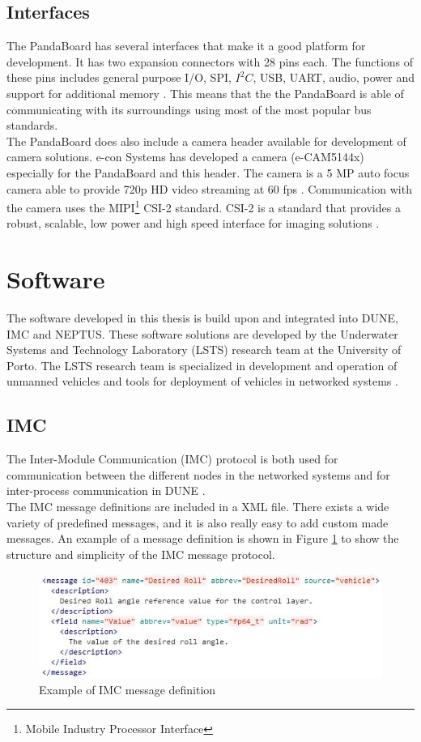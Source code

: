 \subsection{Interfaces}
The PandaBoard has several interfaces that make it a good platform for development. It has two expansion connectors with 28 pins each. The functions of these pins includes general purpose I/O, SPI, $I^2C$, USB, UART, audio, power and support for additional memory \citep{pandaManual}. This means that the the PandaBoard is able of communicating with its surroundings using most of the most popular bus standards.\\
\newline
The PandaBoard does also include a camera header available for development of camera solutions. e-con Systems has developed a camera (e-CAM51\textunderscore 44x) especially for the PandaBoard and this header. The camera is a 5 MP auto focus camera able to provide 720p HD video streaming at 60 fps \citep{camera}. Communication with the camera uses the MIPI\footnote{Mobile Industry Processor Interface} CSI-2 standard. CSI-2 is a standard that provides a robust, scalable, low power and high speed interface for imaging solutions \citep{img}.  
\section{Software}
The software developed in this thesis is build upon and integrated into DUNE, IMC and NEPTUS. These software solutions are developed by the Underwater Systems and Technology Laboratory (LSTS) research team at the University of Porto. The LSTS research team is specialized in development and operation of unmanned vehicles and tools for deployment of vehicles in networked systems \citep{LSTS}.
\subsection{IMC}
The Inter-Module Communication (IMC) protocol is both used for communication between the different nodes in the networked systems and for inter-process communication in DUNE \citep{IMC}.\\
\newline
The IMC message definitions are included in a XML file. There exists a wide variety of predefined messages, and it is also really easy to add custom made messages. An example of a message definition is shown in Figure \ref{IMC} to show the structure and simplicity of the IMC message protocol.
\begin{figure}[H]
\centering
\includegraphics[width = 14cm]{fig/description/imc.jpg}
\caption{Example of IMC message definition}
\label{IMC}
\end{figure}
